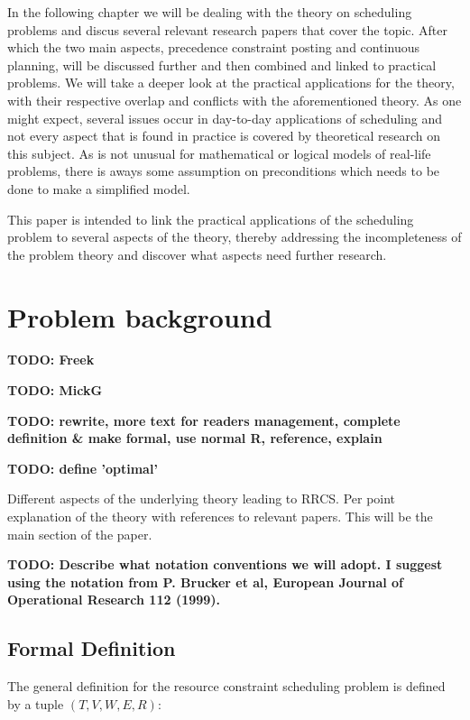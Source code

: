 \documentclass{article}
\newcommand{\TODO}[1]{{\color{red}\textbf{TODO: #1}}}
\begin{document}
In the following chapter we will be dealing with the theory on scheduling problems and discus several relevant research papers that cover the topic.
After which the two main aspects, precedence constraint posting and continuous planning, will be discussed further and then combined and linked to practical problems.
We will take a deeper look at the practical applications for the theory, with their respective overlap and conflicts with the aforementioned theory.
As one might expect, several issues occur in day-to-day applications of scheduling and not every aspect that is found in practice is covered by theoretical research on this subject.
As is not unusual for mathematical or logical models of real-life problems, there is aways some assumption on preconditions which needs to be done to make a simplified model.

This paper is intended to link the practical applications of the scheduling problem to several aspects of the theory, thereby addressing the incompleteness of the problem theory and discover what aspects need further research.

\newpage

\section{Problem background}
\TODO{Freek}

\TODO{MickG}

\TODO{rewrite, more text for readers management, complete definition \& make formal, use normal R, reference, explain}

\TODO{define 'optimal'}

Different aspects of the underlying theory leading to RRCS.
 Per point explanation of the theory with references to relevant papers.
This will be the main section of the paper.

\TODO{Describe what notation conventions we will adopt.
I suggest using the notation from P. Brucker et al, European Journal of Operational Research 112 (1999). }

\subsection{Formal Definition}
The general definition for the resource constraint scheduling problem is defined by a tuple $(T, V, W, E, R)$: \cite{brucker99}
\end{document}

